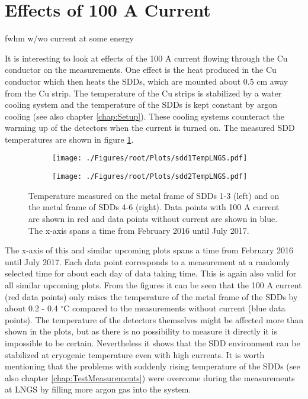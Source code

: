 \section{Effects of 100 A Current}

fwhm w/wo current at some energy

It is interesting to look at effects of the 100 A current flowing through the Cu conductor on the measurements. One effect is the heat produced in the Cu conductor which then heats the SDDs, which are mounted about 0.5 cm away from the Cu strip. The temperature of the Cu strips is stabilized by a water cooling system and the temperature of the SDDs is kept constant by argon cooling (see also chapter \ref{chap:Setup}). These cooling systems counteract the warming up of the detectors when the current is turned on. The measured SDD temperatures are shown in figure \ref{fig:sddTempLngs}.
\begin{figure}[h]
 \centering
 \begin{subfigure}{.49\textwidth}
 \centering
 \texttt{[image: ./Figures/root/Plots/sdd1TempLNGS.pdf]}
 \end{subfigure}
 \hfill
 \begin{subfigure}{.49\textwidth}
 \centering
 \texttt{[image: ./Figures/root/Plots/sdd2TempLNGS.pdf]}
 \end{subfigure}
 \caption{Temperature measured on the metal frame of SDDs 1-3 (left) and on the metal frame of SDDs 4-6 (right). Data points with 100 A current are shown in red and data points without current are shown in blue. The x-axis spans a time from February 2016 until July 2017.}
 \label{fig:sddTempLngs}
\end{figure}
The x-axis of this and similar upcoming plots spans a time from February 2016 until July 2017. Each data point corresponds to a measurement at a randomly selected time for about each day of data taking time. This is again also valid for all similar upcoming plots. From the figures it can be seen that the 100 A current (red data points) only raises the temperature of the metal frame of the SDDs by about 0.2 - 0.4 $^{\circ}$C compared to the measurements without current (blue data points). The temperature of the detectors themselves might be affected more than shown in the plots, but as there is no possibility to measure it directly it is impossible to be certain. Nevertheless it shows that the SDD environment can be stabilized at cryogenic temperature even with high currents. It is worth mentioning that the problems with suddenly rising temperature of the SDDs (see also chapter \ref{chap:TestMeasurements}) were overcome during the measurements at LNGS by filling more argon gas into the system. 

